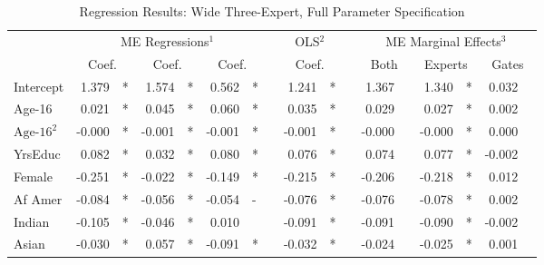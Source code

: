 \documentclass[12pt]{article}
\begin{document}
\begin{landscape}
\begin{table} \centering
  \caption{Regression Results: Wide Three-Expert, Full Parameter Specification}
    \begin{threeparttable}
      \begin{tabular}[l]{l r l r l r l c r l c r l r l r l}

\cmidrule{1-17}
& \multicolumn{6}{c}{ME Regressions$^{1}$} &&  \multicolumn{2}{c}{OLS$^{2}$} && \multicolumn{6}{c}{ME Marginal Effects$^{3}$} \\
\cmidrule(l){2-7}    \cmidrule(l){9-10}     \cmidrule(l){12-17}
& \multicolumn{2}{c}{Coef.} &  \multicolumn{2}{c}{Coef.} &  \multicolumn{2}{c}{Coef.}  && \multicolumn{2}{c}{Coef.} && \multicolumn{2}{c}{Both}    &  \multicolumn{2}{c}{Experts}  &  \multicolumn{2}{c}{Gates} \\
                \cmidrule(l){2-3} \cmidrule(l){4-5} \cmidrule(l){6-7} \cmidrule(l){9-10} \cmidrule(l){12-13} \cmidrule(l){14-15} \cmidrule(l){16-17}
Intercept             &  1.379 & *      &  1.574 & *      &  0.562 & *      &&  1.241 & *     &&  1.367 &          &  1.340 & *        &  0.032 &        \\
Age-16                &  0.021 & *      &  0.045 & *      &  0.060 & *      &&  0.035 & *     &&  0.029 &          &  0.027 & *        &  0.002 &        \\
$\textrm{Age-16}^{2}$ & -0.000 & *      & -0.001 & *      & -0.001 & *      && -0.001 & *     && -0.000 &          & -0.000 & *        &  0.000 &        \\
YrsEduc               &  0.082 & *      &  0.032 & *      &  0.080 & *      &&  0.076 & *     &&  0.074 &          &  0.077 & *        & -0.002 &        \\
Female                & -0.251 & *      & -0.022 & *      & -0.149 & *      && -0.215 & *     && -0.206 &          & -0.218 & *        &  0.012 &        \\
Af Amer               & -0.084 & *      & -0.056 & *      & -0.054 & -      && -0.076 & *     && -0.076 &          & -0.078 & *        &  0.002 &        \\
Indian                & -0.105 & *      & -0.046 & *      &  0.010 &        && -0.091 & *     && -0.091 &          & -0.090 & *        & -0.002 &        \\
Asian                 & -0.030 & *      &  0.057 & *      & -0.091 & *      && -0.032 & *     && -0.024 &          & -0.025 & *        &  0.001 &        \\

\end{tabular}
\end{threeparttable}
\end{table}
\end{landscape}
\end{document}
